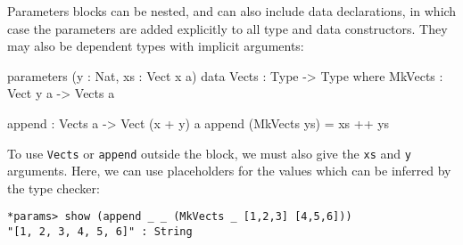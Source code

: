 \noindent
Parameters blocks can be nested, and can also include data declarations, in which case the parameters are added explicitly to all type and data constructors.
They may also be dependent types with implicit arguments:

\begin{code}
parameters (y : Nat, xs : Vect x a)
    data Vects : Type -> Type where
         MkVects : Vect y a -> Vects a
  
    append : Vects a -> Vect (x + y) a
    append (MkVects ys) = xs ++ ys
\end{code}

\noindent
To use \texttt{Vects} or \texttt{append} outside the block, we must also give the \texttt{xs} and \texttt{y} arguments.
Here, we can use placeholders for the values which can be inferred by the type checker:

\begin{lstlisting}[style=stdout]
*params> show (append _ _ (MkVects _ [1,2,3] [4,5,6]))
"[1, 2, 3, 4, 5, 6]" : String
\end{lstlisting}

